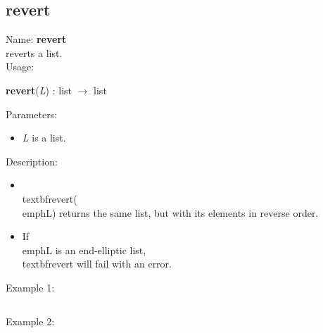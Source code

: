 \subsection{revert}
\label{labrevert}
\noindent Name: \textbf{revert}\\
reverts a list.\\
\noindent Usage: 
\begin{center}
\textbf{revert}(\emph{L}) : \textsf{list} $\rightarrow$ \textsf{list}\\
\end{center}
Parameters: 
\begin{itemize}
\item \emph{L} is a list.
\end{itemize}
\noindent Description: \begin{itemize}

\item \\textbf{revert}(\\emph{L}) returns the same list, but with its elements in reverse order.\n
\item If \\emph{L} is an end-elliptic list, \\textbf{revert} will fail with an error.\n\end{itemize}
\noindent Example 1: 
\begin{center}\begin{minipage}{15cm}\begin{Verbatim}[frame=single]
\end{Verbatim}
\end{minipage}\end{center}
\noindent Example 2: 
\begin{center}\begin{minipage}{15cm}\begin{Verbatim}[frame=single]
\end{Verbatim}
\end{minipage}\end{center}
